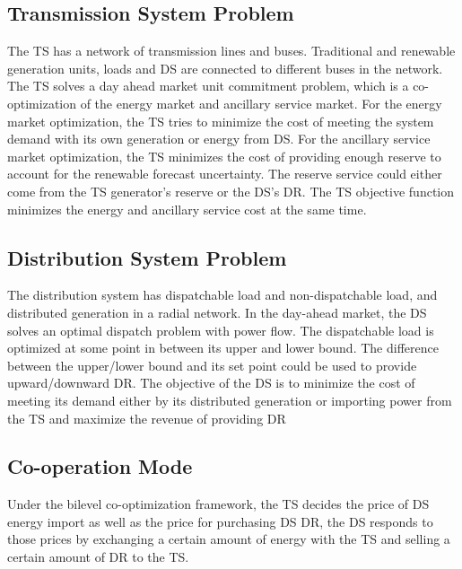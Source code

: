 
\subsection{Transmission System Problem}
The TS has a network of transmission lines and buses. Traditional and renewable generation units, loads and DS are connected to different buses in the network. The TS solves a day ahead market unit commitment problem, which is a co-optimization of the energy market and ancillary service market. For the energy market optimization, the TS tries to minimize the cost of meeting the system demand with its own generation or energy from DS. For the ancillary service market optimization, the TS minimizes the cost of providing enough reserve to account for the renewable forecast uncertainty. The reserve service could either come from the TS generator's reserve or the DS's DR. The TS objective function minimizes the energy and ancillary service cost at the same time.  

\subsection{Distribution System Problem}
The distribution system has dispatchable load and non-dispatchable load, and distributed generation in a radial network. In the day-ahead market, the DS solves an optimal dispatch problem with power flow. The dispatchable load is optimized at some point in between its upper and lower bound. The difference between the upper/lower bound and its set point could be used to provide upward/downward DR. The objective of the DS is to minimize the cost of meeting its demand either by its distributed generation or importing power from the TS and maximize the revenue of providing DR

\subsection{Co-operation Mode}
Under the bilevel co-optimization framework, the TS decides the price of DS energy import as well as the price for purchasing DS DR, the DS responds to those prices by exchanging a certain amount of energy with the TS and selling a certain amount of DR to the TS.

